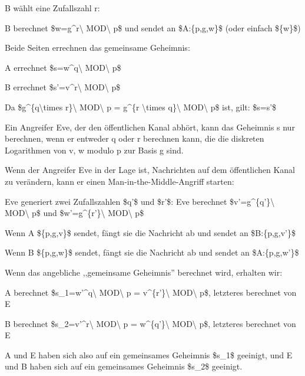 \documentclass[a4paper]{article}
\begin{document}
\begin{multicols}{3}
\begin{itemize*}
\begin{itemize*}
                  \item B wählt eine Zufallszahl r:
                  \begin{itemize*} \item B berechnet \$w=g\^{}r\textbackslash{} MOD\textbackslash{} p\$ und sendet an \$A:\{p,g,w\}\$ (oder einfach \$\{w\}\$) \end{itemize*}
                  \item Beide Seiten errechnen das gemeinsame Geheimnis:
                  \begin{itemize*} \item A errechnet \$s=w\^{}q\textbackslash{} MOD\textbackslash{} p\$ \item B errechnet \$s'=v\^{}r\textbackslash{} MOD\textbackslash{} p\$ \item Da \$g\^{}\{q\textbackslash times r\}\textbackslash{} MOD\textbackslash{} p = g\^{}\{r \textbackslash times q\}\textbackslash{} MOD\textbackslash{} p\$ ist, gilt: \$s=s'\$ \end{itemize*}
                  \item Ein Angreifer Eve, der den öffentlichen Kanal abhört, kann das Geheimnis s nur berechnen, wenn er entweder q oder r berechnen kann, die die diskreten Logarithmen von v, w modulo p zur Basis g sind.
            \end{itemize*}
            \item Wenn der Angreifer Eve in der Lage ist, Nachrichten auf dem
            öffentlichen Kanal zu verändern, kann er einen
            Man-in-the-Middle-Angriff starten:
            \begin{itemize*}
                  \item Eve generiert zwei Zufallszahlen \$q'\$ und \$r'\$: Eve berechnet \$v'=g\^{}\{q'\}\textbackslash{} MOD\textbackslash{} p\$ und \$w'=g\^{}\{r'\}\textbackslash{} MOD\textbackslash{} p\$
                  \item Wenn A \$\{p,g,v\}\$ sendet, fängt sie die Nachricht ab und sendet an \$B:\{p,g,v'\}\$
                  \item Wenn B \$\{p,g,w\}\$ sendet, fängt sie die Nachricht ab und sendet an \$A:\{p,g,w'\}\$
                  \item Wenn das angebliche ,,gemeinsame Geheimnis'' berechnet wird, erhalten wir:
                  \begin{itemize*} \item A berechnet \$s\_1=w'\^{}q\textbackslash{} MOD\textbackslash{} p = v\^{}\{r'\}\textbackslash{} MOD\textbackslash{} p\$, letzteres berechnet von E \item B berechnet \$s\_2=v'\^{}r\textbackslash{} MOD\textbackslash{} p = w\^{}\{q'\}\textbackslash{} MOD\textbackslash{} p\$, letzteres berechnet von E \item A und E haben sich also auf ein gemeinsames Geheimnis \$s\_1\$ geeinigt, und E und B haben sich auf ein gemeinsames Geheimnis \$s\_2\$ geeinigt. \end{itemize*}

\end{itemize*}
\end{itemize*}
\end{multicols}
\end{document}

